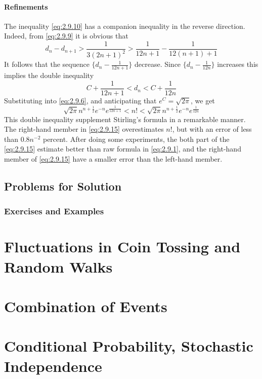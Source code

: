 \documentclass{article}
\numberwithin{equation}{subsection}
\begin{document}
			\paragraph{Refinements} The inequality \eqref{eq:2.9.10} has a companion inequality in the reverse direction. Indeed, from \eqref{eq:2.9.9} it is obvious that
			\begin{equation}
				d_n-d_{n+1} > \frac{1}{3(2n+1)^2} > \frac{1}{12n+1} - \frac{1}{12(n+1)+1}
			\end{equation} It follows that the sequence $\{d_n-\frac{1}{12n+1}\}$ decrease. Since $\{d_n-\frac{1}{12n}\}$ increases this implies the double inequality
			\begin{equation}
				C+\frac{1}{12n+1} < d_n < C+\frac{1}{12n}
			\end{equation}
			Substituting into \eqref{eq:2.9.6}, and anticipating that $e^C=\sqrt{2\pi}$, we get
			\begin{equation}
				\label{eq:2.9.15}
				\sqrt{2\pi}n^{n+\frac{1}{2}}e^{-n}e^{\frac{1}{12n+1}} < n! < \sqrt{2\pi}n^{n+\frac{1}{2}}e^{-n}e^{\frac{1}{12n}}
			\end{equation}
			This double inequality supplement Stirling's formula in a remarkable manner. The right-hand member in \eqref{eq:2.9.15} overestimates $n!$, but with an error of less than $0.8n^{-2}$ percent. After doing some experiments, the both part of the \eqref{eq:2.9.15} estimate better than raw formula in \eqref{eq:2.9.1}, and the right-hand member of \eqref{eq:2.9.15} have a smaller error than the left-hand member.
		\subsection{Problems for Solution}
		\subsubsection{Exercises and Examples}
		\subsubsection{}
		\subsubsection{}
	\newpage
	\section{Fluctuations in Coin Tossing and Random Walks}
			
	\newpage
	\section{Combination of Events}
					
	\newpage
	\section{Conditional Probability, Stochastic Independence}
			
		
\end{document}

